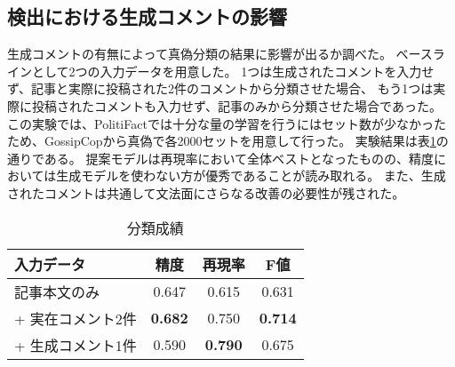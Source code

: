 \subsection{検出における生成コメントの影響}
生成コメントの有無によって真偽分類の結果に影響が出るか調べた。
ベースラインとして2つの入力データを用意した。
1つは生成されたコメントを入力せず、記事と実際に投稿された2件のコメントから分類させた場合、
もう1つは実際に投稿されたコメントも入力せず、記事のみから分類させた場合であった。
この実験では、PolitiFactでは十分な量の学習を行うにはセット数が少なかったため、GossipCopから真偽で各2000セットを用意して行った。
実験結果は表\ref{tbl:classify_results}の通りである。
提案モデルは再現率において全体ベストとなったものの、精度においては生成モデルを使わない方が優秀であることが読み取れる。
また、生成されたコメントは共通して文法面にさらなる改善の必要性が残された。

\begin{table}[!t]
    \renewcommand{\arraystretch}{1.3}
    \caption{分類成績}
    \label{tbl:classify_results}
    \centering
    \begin{tabular}{lccc}
        \hline
        入力データ           & 精度 & 再現率 & F値 \\ \hline
        記事本文のみ         & 0.647     & 0.615  & 0.631    \\
        + 実在コメント2件  & \textbf{0.682}     & 0.750  & \textbf{0.714}    \\
        + 生成コメント1件 & 0.590     & \textbf{0.790}  & 0.675    \\ \hline
    \end{tabular}
\end{table}
